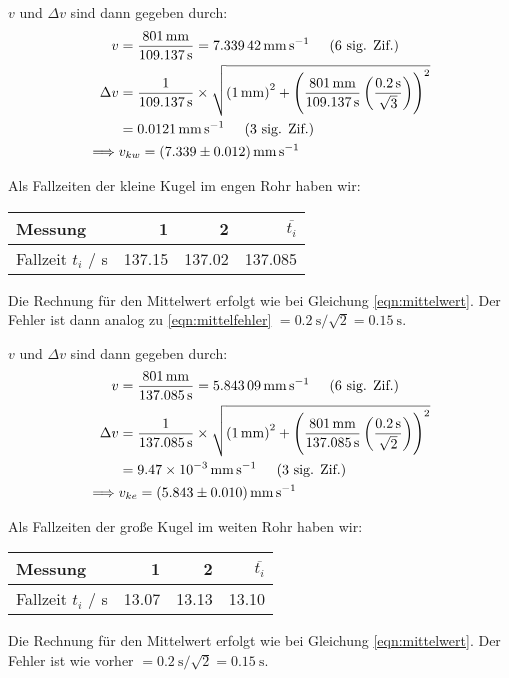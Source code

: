 		$v$ und $\Delta v$ sind dann gegeben durch:
		\begin{align}
			v &= \frac{\SI{801}{\milli\meter}}{\SI{109.137}{\second}} = \SI{7.33942}{\milli\meter\per\second} \sigfig{6} \\
			\Delta v &= \frac{1}{\SI{109.137}{\second}}\times\sqrt{\pbrace{\SI{1}{\milli\meter}}^2 + \pbrace{\frac{\SI{801}{\milli\meter}}{\SI{109.137}{\second}} \pbrace{\frac{\SI{0.2}{\second}}{\sqrt{3}}}}^2} \notag \\
			&= \SI{0.0121}{\milli\meter\per\second} \sigfig{3} \\
			\implies &v_{kw}  = \SI{7.339(12)}{\milli\meter\per\second}
		\end{align}


		Als Fallzeiten der kleine Kugel im engen Rohr haben wir:
		\begin{center}
			\begin{tabular}{l rrr}
				\toprule
				Messung & \num{1} & \num{2} & $\overbar{t_i}$ \\ 
				\midrule
				Fallzeit $t_i$ / \si{\second} & \num{137.15} & \num{137.02} & \num{137.085} \\
				\bottomrule
			\end{tabular}
		\end{center}
		Die Rechnung für den Mittelwert erfolgt wie bei Gleichung \eqref{eqn:mittelwert}. Der Fehler ist dann analog zu \eqref{eqn:mittelfehler} $= \SI{0.2}{\second} / \sqrt{2} = \SI{0.15}{\second}$.

		$v$ und $\Delta v$ sind dann gegeben durch:
		\begin{align}
			v &= \frac{\SI{801}{\milli\meter}}{\SI{137.085}{\second}} = \SI{5.84309}{\milli\meter\per\second} \sigfig{6} \\
			\Delta v &= \frac{1}{\SI{137.085}{\second}}\times\sqrt{\pbrace{\SI{1}{\milli\meter}}^2 + \pbrace{\frac{\SI{801}{\milli\meter}}{\SI{137.085}{\second}} \pbrace{\frac{\SI{0.2}{\second}}{\sqrt{2}}}}^2} \notag \\
			&= \SI{9.47e-3}{\milli\meter\per\second} \sigfig{3} \\
			\implies &v_{ke}  = \SI{5.843(10)}{\milli\meter\per\second}
		\end{align}


		Als Fallzeiten der große Kugel im weiten Rohr haben wir:
		\begin{center}
			\begin{tabular}{l rrr}
				\toprule
				Messung & \num{1} & \num{2} & $\overbar{t_i}$ \\ 
				\midrule
				Fallzeit $t_i$ / \si{\second} & \num{13,07} & \num{13,13} & \num{13,10} \\
				\bottomrule
			\end{tabular}
		\end{center}
		Die Rechnung für den Mittelwert erfolgt wie bei Gleichung \eqref{eqn:mittelwert}. Der Fehler ist wie vorher $= \SI{0.2}{\second} / \sqrt{2} = \SI{0.15}{\second}$.

